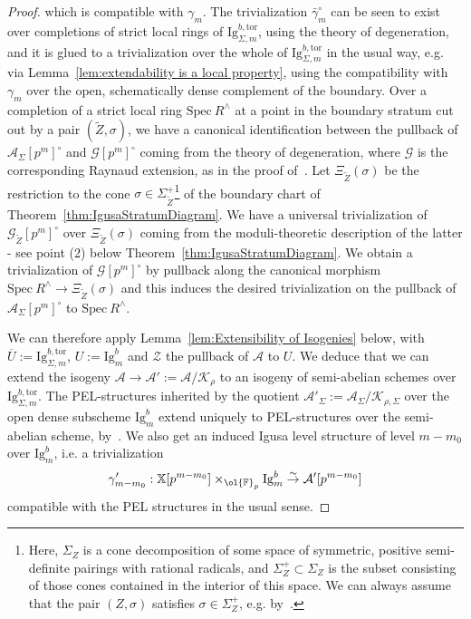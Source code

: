 \documentclass[letterpaper,11pt]{amsart}
\begin{document}
\begin{proof}
which is compatible with $\gamma_m$. The trivialization $\bar{\gamma}_m^\circ$ can be seen to exist over completions of strict local rings of $\mathrm{Ig}^{b,\mathrm{tor}}_{\Sigma, m}$, using the theory of degeneration, and it is glued to a trivialization over the whole of $\mathrm{Ig}^{b,\mathrm{tor}}_{\Sigma, m}$ in the usual way, e.g. via Lemma~\ref{lem:extendability is a local property}, using the compatibility with $\gamma_m$ over the open, schematically dense complement of the boundary. Over a completion of a strict local ring $\mathrm{Spec}\ R^{\wedge}$ at a point in the boundary stratum cut out by a pair $(\widetilde{Z}, \sigma)$, we have a canonical identification between the pullback of $\mathcal{A}_{\Sigma}[p^m]^\circ$ and $\mathcal{G}[p^m]^\circ$ coming from the theory of degeneration, where $\mathcal{G}$ is the corresponding Raynaud extension, as in the proof of~\cite[Prop. 3.2.1]{CS2}. Let $\Xi_{\widetilde{Z}}(\sigma)$ be the restriction to the cone $\sigma\in \Sigma_{\widetilde{Z}}^+$\footnote{Here, $\Sigma_Z$ is a cone decomposition of some space of symmetric, positive semi-definite pairings with rational radicals, and $\Sigma^+_{Z}\subset \Sigma_{Z}$ is the subset consisting of those cones contained in the interior of this space. We can always assume that the pair $(Z,\sigma)$ satisfies $\sigma\in \Sigma^+_{Z}$, e.g. by~\cite[Prop. 2.1.2 (4)]{LanStroh}.} of the boundary chart of Theorem~\ref{thm:IgusaStratumDiagram}. We have a universal trivialization of $\mathcal{G}_{\widetilde{Z}}[p^m]^\circ$ over $\Xi_{\widetilde{Z}}(\sigma)$ coming from the moduli-theoretic description of the latter - see point (2) below Theorem~\ref{thm:IgusaStratumDiagram}. We obtain a trivialization of $\mathcal{G}[p^m]^\circ$ by pullback along the canonical morphism $\mathrm{Spec}\ R^\wedge\to \Xi_{\widetilde{Z}}(\sigma)$ and this induces the desired trivialization on the pullback of $\mathcal{A}_{\Sigma}[p^m]^\circ$ to $\mathrm{Spec}\ R^{\wedge}$.   

We can therefore apply Lemma~\ref{lem:Extensibility of Isogenies} below, with $\overline{U}:=\mathrm{Ig}^{b,\mathrm{tor}}_{\Sigma, m}$, $U:=\mathrm{Ig}^b_m$ and $\mathcal{Z}$ the pullback of $\mathcal{A}$ to $U$. We deduce that we can extend the isogeny  $\mathcal{A}\to \mathcal{A}':=\mathcal{A}/\mathcal{K}_{\rho}$ to an isogeny of semi-abelian schemes over $\mathrm{Ig}^{b, \mathrm{tor}}_{\Sigma, m}$. The PEL-structures inherited by the quotient $\mathcal{A}'_{\Sigma}:=\mathcal{A}_{\Sigma}/\mathcal{K}_{\rho, \Sigma}$ over the open dense subscheme $\mathrm{Ig}^b_m$ extend uniquely to  PEL-structures over the semi-abelian scheme, by~\cite[Chapter I, Proposition 2.7]{faltings-chai}. We also get an induced Igusa level structure of level $m-m_0$ over $\mathrm{Ig}^{b}_{m}$, i.e. a trivialization 
\[
\gamma'_{m-m_0}:\mathbb{X}[p^{m-m_0}]\times_{\ol{\mathbb{F}}_p} \mathrm{Ig}^{b}_{m} \stackrel{\sim}{\to} \mathcal{A}'[p^{m-m_0}]
\]
compatible with the PEL structures in the usual sense. 


\end{proof}
\end{document}
